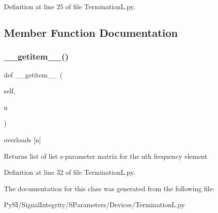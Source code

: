 Definition at line 25 of file Termination\+L.\+py.



\subsection{Member Function Documentation}
\mbox{\label{classSignalIntegrity_1_1SParameters_1_1Devices_1_1TerminationL_1_1TerminationL_ab7a6da5139e0878b590d68292aaa70f2}} 
\subsubsection{\texorpdfstring{\+\_\+\+\_\+getitem\+\_\+\+\_\+()}{\_\_getitem\_\_()}}
{\footnotesize\ttfamily def \+\_\+\+\_\+getitem\+\_\+\+\_\+ (\begin{DoxyParamCaption}\item[{}]{self,  }\item[{}]{n }\end{DoxyParamCaption})}



overloads \mbox{[}n\mbox{]} 

\begin{DoxyReturn}{Returns}
list of list s-\/parameter matrix for the nth frequency element 
\end{DoxyReturn}


Definition at line 32 of file Termination\+L.\+py.



The documentation for this class was generated from the following file\+:\begin{DoxyCompactItemize}
\item 
Py\+S\+I/\+Signal\+Integrity/\+S\+Parameters/\+Devices/Termination\+L.\+py\end{DoxyCompactItemize}
